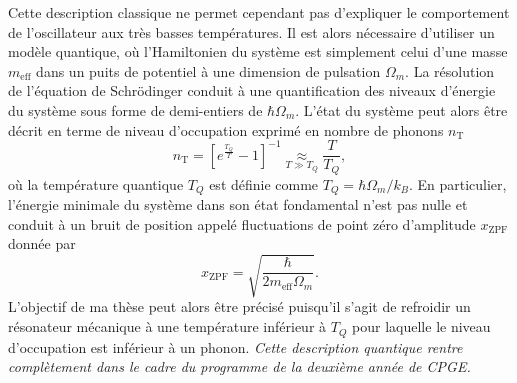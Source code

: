 \documentclass[12pt,a4paper]{article}
\begin{document}
Cette description classique ne permet cependant pas d'expliquer le comportement de l'oscillateur aux très basses températures.
Il est alors nécessaire d'utiliser un modèle quantique, où l'Hamiltonien du système est simplement celui d'une masse $m_\mathrm{eff}$ dans un puits de potentiel à une dimension de pulsation $\Omega_m$.
La résolution de l'équation de Schrödinger conduit à une quantification des niveaux d'énergie du système sous forme de demi-entiers de $\hbar\Omega_m$.
L'état du système peut alors être décrit en terme de niveau d'occupation exprimé en nombre de phonons $n_\mathrm{T}$
\begin{equation}
n_\mathrm{T} = \left[ e^\frac{T_Q}{T} -1\right]^{-1} \underset{T\gg T_Q}{\approx} \frac{T}{T_Q},
\end{equation}
où la température quantique $T_Q$ est définie comme $T_Q = \hbar\Omega_m/k_B$.
En particulier, l'énergie minimale du système dans son état fondamental n'est pas nulle et conduit à un bruit de position appelé fluctuations de point zéro d'amplitude $x_\mathrm{ZPF}$ donnée par
\begin{equation}
x_\mathrm{ZPF}=\sqrt{\frac{\hbar}{2m_\mathrm{eff}\Omega_m}}.
\end{equation}
L'objectif de ma thèse peut alors être précisé puisqu'il s'agit de refroidir un résonateur mécanique à une température inférieur à $T_Q$ pour laquelle le niveau d'occupation est inférieur à un phonon.
\emph{Cette description quantique rentre complètement dans le cadre du programme de la deuxième année de CPGE.}
\end{document}
